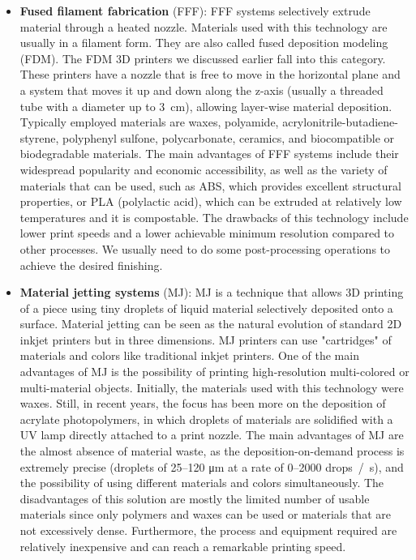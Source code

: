 \begin{itemize}
    \item \textbf{Fused filament fabrication} (FFF): FFF systems selectively extrude material through a heated nozzle. Materials used with this technology are usually in a filament form. They are also called fused deposition modeling (FDM). The FDM 3D printers we discussed earlier fall into this category. These printers have a nozzle that is free to move in the horizontal plane and a system that moves it up and down along the z-axis (usually a threaded tube with a diameter up to \SI{3}{\centi\metre}), allowing layer-wise material deposition. Typically employed materials are waxes, polyamide, acrylonitrile-butadiene-styrene, polyphenyl sulfone, polycarbonate, ceramics, and biocompatible or biodegradable materials. The main advantages of FFF systems include their widespread popularity and economic accessibility, as well as the variety of materials that can be used, such as ABS, which provides excellent structural properties, or PLA (polylactic acid), which can be extruded at relatively low temperatures and it is compostable. The drawbacks of this technology include lower print speeds and a lower achievable minimum resolution compared to other processes. We usually need to do some post-processing operations to achieve the desired finishing.
    \item \textbf{Material jetting systems} (MJ): MJ is a technique that allows 3D printing of a piece using tiny droplets of liquid material selectively deposited onto a surface. Material jetting can be seen as the natural evolution of standard 2D inkjet printers but in three dimensions. MJ printers can use "cartridges" of materials and colors like traditional inkjet printers. One of the main advantages of MJ is the possibility of printing high-resolution multi-colored or multi-material objects. Initially, the materials used with this technology were waxes. Still, in recent years, the focus has been more on the deposition of acrylate photopolymers, in which droplets of materials are solidified with a UV lamp directly attached to a print nozzle. The main advantages of MJ are the almost absence of material waste, as the deposition-on-demand process is extremely precise (droplets of \numrange{25}{120} \unit{\micro\meter} at a rate of \numrange{0}{2000} \unit{drops / \second}), and the possibility of using different materials and colors simultaneously. The disadvantages of this solution are mostly the limited number of usable materials since only polymers and waxes can be used or materials that are not excessively dense. Furthermore, the process and equipment required are relatively inexpensive and can reach a remarkable printing speed.

\end{itemize}
